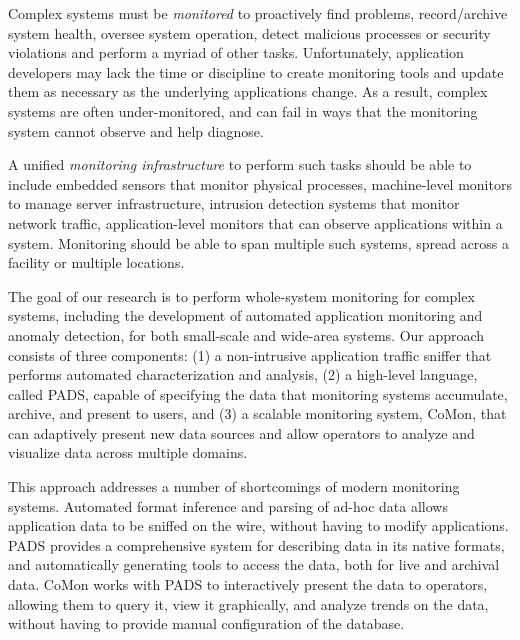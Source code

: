 

Complex systems must be {\em monitored} to proactively find problems,
record/archive system health, oversee system operation, detect
malicious processes or security violations and perform a myriad of
other tasks.  Unfortunately, application developers may lack the time
or discipline to create monitoring tools and update them as necessary
as the underlying applications change. As a result, complex systems
are often under-monitored, and can fail in ways that the monitoring
system cannot observe and help diagnose.

A unified {\em monitoring infrastructure} to perform such tasks should
be able to include embedded sensors that monitor physical processes,
machine-level monitors to manage server infrastructure, intrusion
detection systems that monitor network traffic, application-level
monitors that can observe applications within a system. Monitoring
should be able to span multiple such systems, spread across a facility
or multiple locations.

The goal of our research is to perform whole-system monitoring for
complex systems, including the development of automated application
monitoring and anomaly detection, for both small-scale and wide-area
systems. Our approach consists of three components: (1) a
non-intrusive application traffic sniffer that performs automated
characterization and analysis, (2) a high-level language, called PADS,
capable of specifying the data that monitoring systems accumulate,
archive, and present to users, and (3) a scalable monitoring system,
CoMon, that can adaptively present new data sources and allow
operators to analyze and visualize data across multiple domains.

This approach addresses a number of shortcomings of modern monitoring
systems. Automated format inference and parsing of ad-hoc data allows
application data to be sniffed on the wire, without having to modify
applications. PADS provides a comprehensive system for describing data
in its native formats, and automatically generating tools to access
the data, both for live and archival data. CoMon works with PADS to
interactively present the data to operators, allowing them to query
it, view it graphically, and analyze trends on the data, without having
to provide manual configuration of the database.

